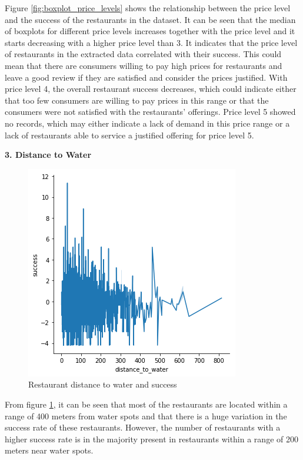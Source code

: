 \documentclass[a4paper, 11pt, oneside]{Thesis}  %
\begin{document}
Figure \ref{fig:boxplot_price_levels} shows the relationship between the price level and the success of the restaurants in the dataset. It can be seen that the median of boxplots for different price levels increases together with the price level and it starts decreasing with a higher price level than 3. It indicates that the price level of restaurants in the extracted data correlated with their success. This could mean that there are consumers willing to pay high prices for restaurants and leave a good review if they are satisfied and consider the prices justified. With price level 4, the overall restaurant success decreases, which could indicate either that too few consumers are willing to pay prices in this range or that the consumers were not satisfied with the restaurants’ offerings. Price level 5 showed no records, which may either indicate a lack of demand in this price range or a lack of restaurants able to service a justified offering for price level 5.

\textbf{3.	Distance to Water}
 
\begin{figure}[h]
\includegraphics[scale=0.7]{Figures/Exploratory/lineplot_distance_to_water.png}
\centering
\caption{Restaurant distance to water and success}
\label{fig:lineplot_distance_to_water}
\end{figure}
 
From figure \ref{fig:lineplot_distance_to_water}, it can be seen that most of the restaurants are located within a range of 400 meters from water spots and that there is a huge variation in the success rate of these restaurants. However, the number of restaurants with a higher success rate is in the majority present in restaurants within a range of 200 meters near water spots.
\end{document}
